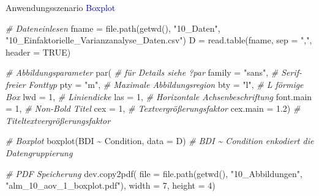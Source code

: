 \documentclass[
  8pt,
  ignorenonframetext,
]{beamer}
\newenvironment{Shaded}{\begin{snugshade}}{\end{snugshade}}
\newcommand{\AttributeTok}[1]{\textcolor[rgb]{0.77,0.63,0.00}{#1}}
\newcommand{\CommentTok}[1]{\textcolor[rgb]{0.56,0.35,0.01}{\textit{#1}}}
\newcommand{\ConstantTok}[1]{\textcolor[rgb]{0.00,0.00,0.00}{#1}}
\newcommand{\DecValTok}[1]{\textcolor[rgb]{0.00,0.00,0.81}{#1}}
\newcommand{\FloatTok}[1]{\textcolor[rgb]{0.00,0.00,0.81}{#1}}
\newcommand{\FunctionTok}[1]{\textcolor[rgb]{0.00,0.00,0.00}{#1}}
\newcommand{\NormalTok}[1]{#1}
\newcommand{\OtherTok}[1]{\textcolor[rgb]{0.56,0.35,0.01}{#1}}
\newcommand{\SpecialCharTok}[1]{\textcolor[rgb]{0.00,0.00,0.00}{#1}}
\newcommand{\StringTok}[1]{\textcolor[rgb]{0.31,0.60,0.02}{#1}}
\begin{document}
\begin{frame}[fragile]{Anwendungsszenario}
\protect\hypertarget{anwendungsszenario-2}{}
\textcolor{darkblue}{Boxplot} \vspace{3mm} \tiny {}

\begin{Shaded}
\begin{Highlighting}[]
\CommentTok{\# Dateneinlesen}
\NormalTok{fname       }\OtherTok{=} \FunctionTok{file.path}\NormalTok{(}\FunctionTok{getwd}\NormalTok{(), }\StringTok{"10\_Daten"}\NormalTok{, }\StringTok{"10\_Einfaktorielle\_Varianzanalyse\_Daten.csv"}\NormalTok{)}
\NormalTok{D           }\OtherTok{=} \FunctionTok{read.table}\NormalTok{(fname, }\AttributeTok{sep =} \StringTok{","}\NormalTok{, }\AttributeTok{header =} \ConstantTok{TRUE}\NormalTok{)}

\CommentTok{\# Abbildungsparameter}
\FunctionTok{par}\NormalTok{(                                        }\CommentTok{\# für Details siehe ?par}
\AttributeTok{family      =} \StringTok{"sans"}\NormalTok{,                       }\CommentTok{\# Serif{-}freier Fonttyp}
\AttributeTok{pty         =} \StringTok{"m"}\NormalTok{,                          }\CommentTok{\# Maximale Abbildungsregion}
\AttributeTok{bty         =} \StringTok{"l"}\NormalTok{,                          }\CommentTok{\# L förmige Box}
\AttributeTok{lwd         =} \DecValTok{1}\NormalTok{,                            }\CommentTok{\# Liniendicke}
\AttributeTok{las         =} \DecValTok{1}\NormalTok{,                            }\CommentTok{\# Horizontale Achsenbeschriftung}
\AttributeTok{font.main   =} \DecValTok{1}\NormalTok{,                            }\CommentTok{\# Non{-}Bold Titel}
\AttributeTok{cex         =} \DecValTok{1}\NormalTok{,                            }\CommentTok{\# Textvergrößerungsfaktor}
\AttributeTok{cex.main    =} \FloatTok{1.2}\NormalTok{)                          }\CommentTok{\# Titeltextvergrößerungsfaktor}

\CommentTok{\# Boxplot}
\FunctionTok{boxplot}\NormalTok{(BDI }\SpecialCharTok{\textasciitilde{}}\NormalTok{ Condition, }\AttributeTok{data =}\NormalTok{ D)          }\CommentTok{\# BDI \textasciitilde{} Condition enkodiert die Datengruppierung}

\CommentTok{\# PDF Speicherung}
\FunctionTok{dev.copy2pdf}\NormalTok{(}
\AttributeTok{file        =} \FunctionTok{file.path}\NormalTok{(}\FunctionTok{getwd}\NormalTok{(), }\StringTok{"10\_Abbildungen"}\NormalTok{, }\StringTok{"alm\_10\_aov\_1\_boxplot.pdf"}\NormalTok{),}
\AttributeTok{width       =} \DecValTok{7}\NormalTok{,}
\AttributeTok{height      =} \DecValTok{4}\NormalTok{)}
\end{Highlighting}
\end{Shaded}
\end{frame}
\end{document}
